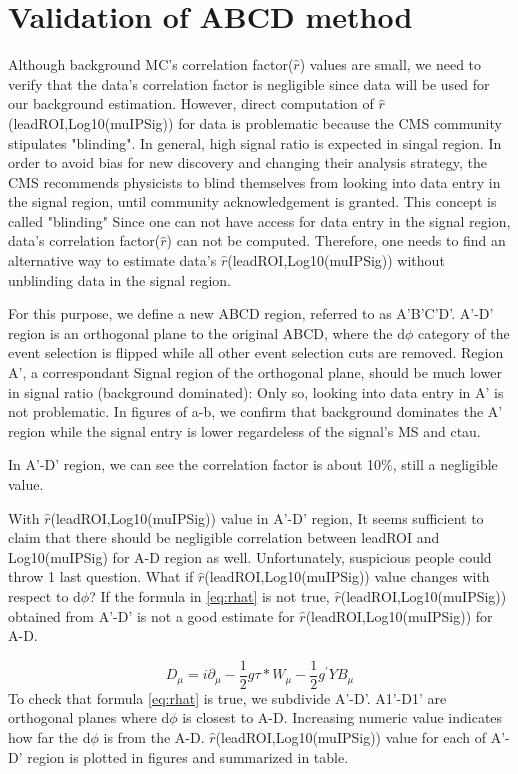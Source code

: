 \section{Validation of ABCD method}

Although background MC's correlation factor($\hat{r}$) values are small, we need to verify that the data's correlation factor is negligible since data will be used for our background estimation.
However, direct computation of $\hat{r}$(leadROI,Log10(muIPSig)) for data is problematic because the CMS community stipulates "blinding".
In general, high signal ratio is expected in singal region.
In order to avoid bias for new discovery and changing their analysis strategy, the CMS recommends physicists to blind themselves from looking into data entry in the signal region, until community acknowledgement is granted.
This concept is called "blinding"
Since one can not have access for data entry in the signal region, data's correlation factor($\hat{r}$) can not be computed. 
Therefore, one needs to find an alternative way to estimate data's $\hat{r}$(leadROI,Log10(muIPSig)) without unblinding data in the signal region.

For this purpose, we define a new ABCD region, referred to as A'B'C'D'.
A'-D' region is an orthogonal plane to the original ABCD, where the d$\phi$ category of the event selection is flipped while all other event selection cuts are removed.
Region A', a correspondant Signal region of the orthogonal plane, should be much lower in signal ratio (background dominated): Only so, looking into data entry in A' is not problematic. 
In figures of a-b, we confirm that background dominates the A' region while the signal entry is lower regardeless of the signal's MS and ctau.





In A'-D' region, we can see the correlation factor is about 10\%, still a negligible value. 


With $\hat{r}$(leadROI,Log10(muIPSig)) value in A'-D' region, It seems sufficient to claim that there should be negligible correlation between leadROI and Log10(muIPSig) for A-D region as well.
Unfortunately, suspicious people could throw 1 last question.
What if $\hat{r}$(leadROI,Log10(muIPSig)) value changes with respect to d$\phi$?
If the formula in \ref{eq:rhat} is not true, $\hat{r}$(leadROI,Log10(muIPSig)) obtained from A'-D' is not a good estimate for $\hat{r}$(leadROI,Log10(muIPSig)) for A-D.

\begin{equation}
\label{eq:covld}
	D_{\mu}  = i\partial_{\mu}-\frac{1}{2}g\tau*W_{\mu}-\frac{1}{2}g^{'}YB_{\mu} 
\end{equation}
To check that formula \ref{eq:rhat} is true, we subdivide A'-D'.
A1'-D1' are orthogonal planes where d$\phi$ is closest to A-D.
Increasing numeric value indicates how far the d$\phi$ is from the A-D.
$\hat{r}$(leadROI,Log10(muIPSig)) value for each of A'-D' region is plotted in figures and summarized in table.



